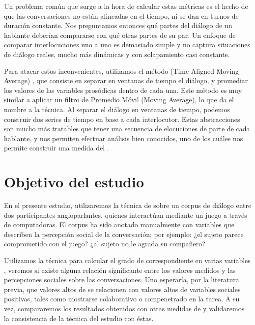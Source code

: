 Un problema común que surge a la hora de calcular estas métricas es el hecho de que las conversaciones no están alineadas en el tiempo, ni se dan en turnos de duración constante. Nos preguntamos entonces qué partes del diálogo de un hablante deberían compararse con qué otras partes de su par. Un enfoque de comparar interlocuciones uno a uno es demasiado simple y no captura situaciones de diálogo reales, mucho más dinámicas y con solapamiento casi constante.

Para atacar estos inconvenientes, utilizamos el método \TAMA(Time Aligned Moving Average) \cite{KOU2008}, que consiste en separar en ventanas de tiempo el diálogo, y promediar los valores de las variables prosódicas dentro de cada una. Este método es muy similar a aplicar un filtro de Promedio Móvil (Moving Average), lo que da el nombre a la técnica. Al separar el diálogo en ventanas de tiempo, podemos construir dos series de tiempo en base a cada interlocutor. Estas abstracciones son mucho más tratables que tener una secuencia de elocuciones de parte de cada hablante, y nos permiten efectuar análisis bien conocidos, uno de los cuáles nos permite construir una medida del \entrainment.

\section{Objetivo del estudio}

En el presente estudio, utilizaremos la técnica de \TAMA sobre un corpus de diálogo entre dos participantes angloparlantes, quienes interactúan mediante un juego a través de computadoras. El corpus ha sido anotado manualmente con variables que describen la percepción social de la conversación; por ejemplo: ¿el sujeto parece comprometido con el juego? ¿al sujeto no le agrada su compañero?

Utilizamos la técnica \TAMA para calcular el grado de \entrainment correspondiente en varias variables \ap, veremos si existe alguna relación significante entre los valores medidos y las percepciones sociales sobre las conversaciones. Uno esperaría, por la literatura previa, que valores altos de \entrainment se relacionen con valores altos de variables sociales positivas, tales como mostrarse colaborativo o compenetrado en la tarea. A su vez, compararemos los resultados obtenidos con otras medidas de \entrainment y validaremos la consistencia de la técnica del estudio con éstas.
